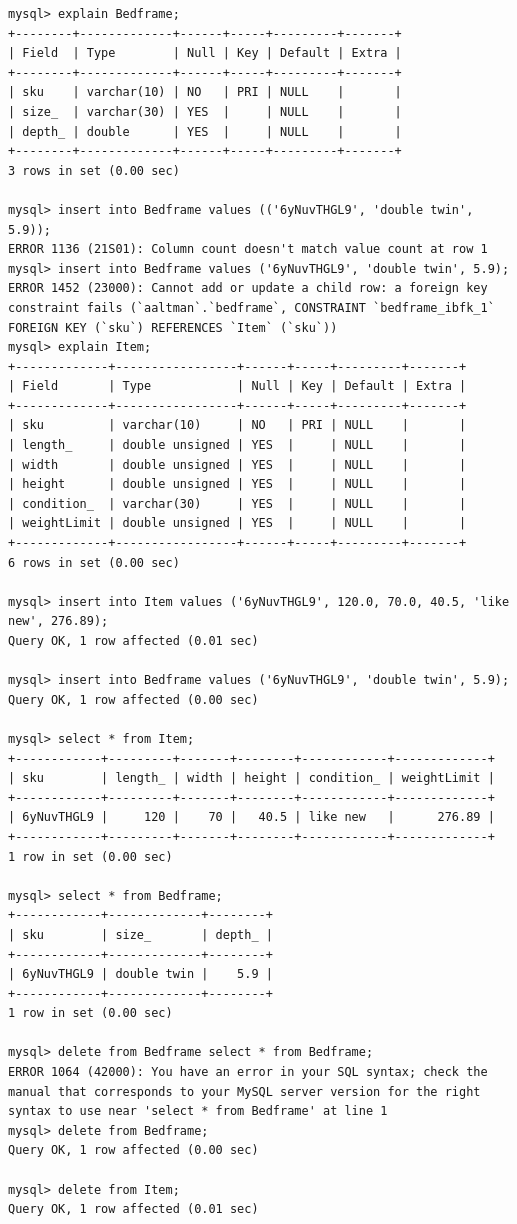 \documentclass[american,extrafontsizes,12pt,portrait,letterpaper,oneside,onecolumn,final]{memoir}
\begin{document}
\begin{verbatim}
mysql> explain Bedframe;
+--------+-------------+------+-----+---------+-------+
| Field  | Type        | Null | Key | Default | Extra |
+--------+-------------+------+-----+---------+-------+
| sku    | varchar(10) | NO   | PRI | NULL    |       |
| size_  | varchar(30) | YES  |     | NULL    |       |
| depth_ | double      | YES  |     | NULL    |       |
+--------+-------------+------+-----+---------+-------+
3 rows in set (0.00 sec)

mysql> insert into Bedframe values (('6yNuvTHGL9', 'double twin', 5.9));
ERROR 1136 (21S01): Column count doesn't match value count at row 1
mysql> insert into Bedframe values ('6yNuvTHGL9', 'double twin', 5.9);
ERROR 1452 (23000): Cannot add or update a child row: a foreign key constraint fails (`aaltman`.`bedframe`, CONSTRAINT `bedframe_ibfk_1` FOREIGN KEY (`sku`) REFERENCES `Item` (`sku`))
mysql> explain Item;
+-------------+-----------------+------+-----+---------+-------+
| Field       | Type            | Null | Key | Default | Extra |
+-------------+-----------------+------+-----+---------+-------+
| sku         | varchar(10)     | NO   | PRI | NULL    |       |
| length_     | double unsigned | YES  |     | NULL    |       |
| width       | double unsigned | YES  |     | NULL    |       |
| height      | double unsigned | YES  |     | NULL    |       |
| condition_  | varchar(30)     | YES  |     | NULL    |       |
| weightLimit | double unsigned | YES  |     | NULL    |       |
+-------------+-----------------+------+-----+---------+-------+
6 rows in set (0.00 sec)

mysql> insert into Item values ('6yNuvTHGL9', 120.0, 70.0, 40.5, 'like new', 276.89);
Query OK, 1 row affected (0.01 sec)

mysql> insert into Bedframe values ('6yNuvTHGL9', 'double twin', 5.9);
Query OK, 1 row affected (0.00 sec)

mysql> select * from Item;
+------------+---------+-------+--------+------------+-------------+
| sku        | length_ | width | height | condition_ | weightLimit |
+------------+---------+-------+--------+------------+-------------+
| 6yNuvTHGL9 |     120 |    70 |   40.5 | like new   |      276.89 |
+------------+---------+-------+--------+------------+-------------+
1 row in set (0.00 sec)

mysql> select * from Bedframe;
+------------+-------------+--------+
| sku        | size_       | depth_ |
+------------+-------------+--------+
| 6yNuvTHGL9 | double twin |    5.9 |
+------------+-------------+--------+
1 row in set (0.00 sec)

mysql> delete from Bedframe select * from Bedframe;
ERROR 1064 (42000): You have an error in your SQL syntax; check the manual that corresponds to your MySQL server version for the right syntax to use near 'select * from Bedframe' at line 1
mysql> delete from Bedframe;
Query OK, 1 row affected (0.00 sec)

mysql> delete from Item;
Query OK, 1 row affected (0.01 sec)
\end{verbatim}
\end{document}
